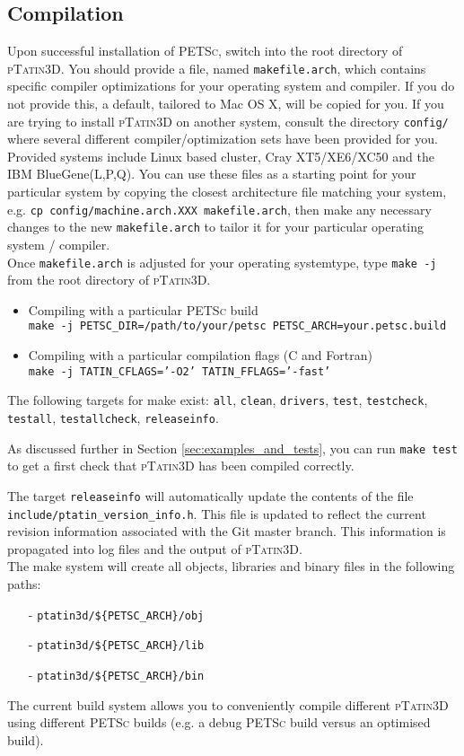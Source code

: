 \documentclass[paper=a4, fontsize=10pt,twoside]{scrartcl}
\newcommand{\ptat}{{{\textsc{pTatin3D}}}}
\newcommand{\PETSc}{{{\textsc{PETSc}}}}
\newcommand{\shellcmd}[1]{\\\indent\indent\texttt{\hspace{5mm}\footnotesize #1}\\}
\newcommand{\unix}[1]{\texttt{\footnotesize #1}}
\begin{document}
\subsection{Compilation}
Upon successful installation of {\PETSc}, switch into the root directory of {\ptat}.
You should provide a file, named \unix{makefile.arch}, which contains specific compiler optimizations for your operating system and compiler.
If you do not provide this, a default, tailored to Mac OS X, will be copied for you.
If you are trying to install {\ptat} on another system,
consult the directory
\unix{config/}
where several different compiler/optimization sets have been provided for you. Provided systems include Linux based cluster, Cray XT5/XE6/XC50 and the  IBM BlueGene(L,P,Q). You can use these files as a starting point for your particular system by copying the closest architecture file matching your system, e.g. \unix{cp config/machine.arch.XXX makefile.arch}, then make any necessary changes to the new \unix{makefile.arch} to tailor it for your particular operating system / compiler.
\\[8pt]
%
Once \unix{makefile.arch} is adjusted for your operating systemtype, type \unix{make -j} from the root directory of \ptat{}.
\begin{itemize}
	\item Compiling with a particular {\PETSc} build
	\shellcmd{make -j PETSC\_DIR=/path/to/your/petsc PETSC\_ARCH=your.petsc.build}
	\item Compiling with a particular compilation flags (C and Fortran)
	\shellcmd{make -j TATIN\_CFLAGS='-O2' TATIN\_FFLAGS='-fast'}
\end{itemize}
%
The following targets for make exist: \unix{all}, \unix{clean}, \unix{drivers}, \unix{test}, \unix{testcheck}, \unix{testall}, \unix{testallcheck}, \unix{releaseinfo}.

As discussed further in Section \ref{sec:examples_and_tests}, you can run \unix{make test} to get a first check that {\ptat} has been compiled correctly.

The target \unix{releaseinfo} will automatically update the contents of the file \unix{include/ptatin\_version\_info.h}.
This file is updated to reflect the current revision information associated with the Git master branch. This information is
propagated into log files and the output of {\ptat}.
\\[8pt]
%
The make system will create all objects, libraries and binary files in the following paths:
\begin{enumerate}
\setlength\itemsep{0mm}
	\item[-] \unix{ptatin3d/\$\{PETSC\_ARCH\}/obj}
	\item[-] \unix{ptatin3d/\$\{PETSC\_ARCH\}/lib}
	\item[-] \unix{ptatin3d/\$\{PETSC\_ARCH\}/bin}
\end{enumerate}
The current build system allows you to conveniently compile different {\ptat} using different {\PETSc} builds (e.g. a debug {\PETSc} build versus an optimised build).
\end{document}
